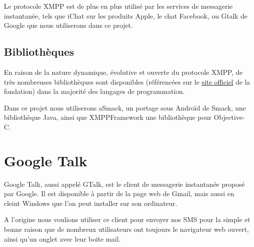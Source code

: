 Le protocole XMPP est de plus en plus utilisé par les services de messagerie instantanée, tels que iChat sur les produits Apple, le chat Facebook, ou Gtalk de Google que nous utiliserons dans ce projet.
\\




\subsection{Bibliothèques}

En raison de la nature dynamique, évolutive et ouverte du protocole XMPP, de très nombreuses bibliothèques sont disponibles (référencées sur le \href{http://xmpp.org/xmpp-software/libraries/}{site officiel} de la fondation) dans la majorité des langages de programmation.

Dans ce projet nous utiliserons aSmack, un portage sous Androïd de Smack, une bibliothèque Java, ainsi que XMPPFramework une bibliothèque pour Objective-C.
\\






\section{Google Talk}

Google Talk, aussi appelé GTalk, est le client de messagerie instantanée proposé par Google.
Il est disponible à partir de la page web de Gmail, mais aussi en cleint Windows que l'on peut installer sur son ordinateur.

A l'origine nous voulions utiliser ce client pour envoyer nos SMS pour la simple et bonne raison que de nombreux utilisateurs ont toujours le navigateur web ouvert, ainsi qu'un onglet avec leur boite mail.
\\



